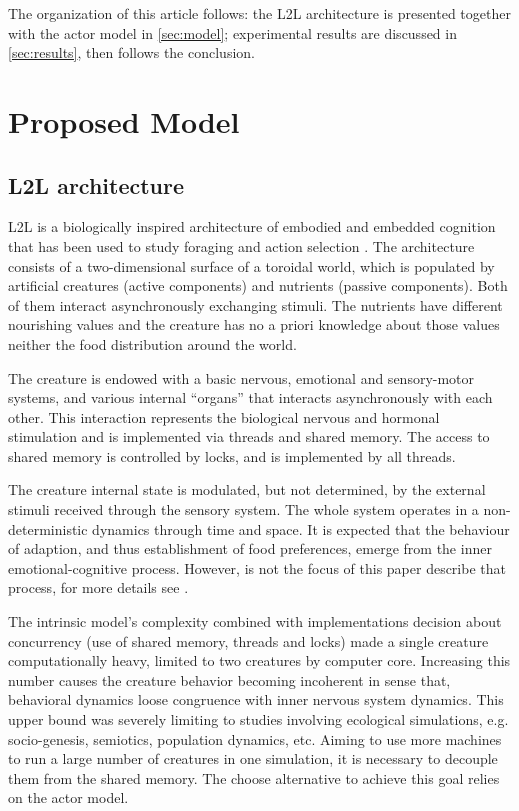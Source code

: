\documentclass[runningheads]{llncs}
\begin{document}
The organization of this article follows: the L2L architecture is presented together with the actor model in \autoref{sec:model}; experimental results are discussed in \autoref{sec:results}, then follows the conclusion.

\section{Proposed Model}
\label{sec:model}

\subsection{L2L architecture}
\label{subsec:l2l}
L2L is a biologically inspired architecture of embodied and embedded cognition that has been used to study foraging and action selection \cite{Campos}. The architecture consists of a two-dimensional surface of a toroidal world, which is populated by artificial creatures (active components) and nutrients (passive components). Both of them interact asynchronously exchanging stimuli. The nutrients have different nourishing values and the creature has no a priori knowledge about those values neither the food distribution around the world. 

The creature is endowed with a basic nervous, emotional and sensory-motor systems, and various internal ``organs'' that interacts asynchronously with each other. This interaction represents the biological nervous and hormonal stimulation and is implemented via threads and shared memory. The access to shared memory is controlled by locks, and is implemented by all threads.

The creature internal state is modulated, but not determined, by the external stimuli received through the sensory system. The whole system operates in a non-deterministic dynamics through time and space. It is expected that the behaviour of adaption, and thus establishment of food preferences, emerge from the inner emotional-cognitive process. However, is not the focus of this paper describe that process, for more details see \cite{Campos}.

The intrinsic model's complexity combined with implementations decision about concurrency (use of shared memory, threads and locks) made a single creature computationally heavy, limited to two creatures by computer core. Increasing this number causes the creature behavior becoming incoherent in sense that, behavioral dynamics loose congruence with inner nervous system dynamics. This upper bound was severely limiting to studies involving ecological simulations, e.g. socio-genesis, semiotics, population dynamics, etc. Aiming to use more machines to run a large number of creatures in one simulation, it is necessary to decouple them from the shared memory. The choose alternative to achieve this goal relies on the actor model.
\end{document}
